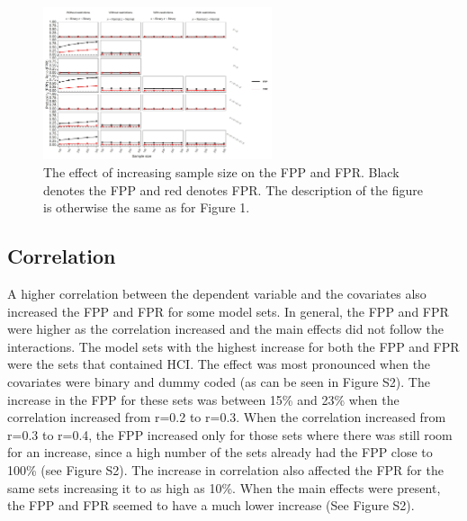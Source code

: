 \begin{figure}[t]
\includegraphics[width=0.6\textwidth]{R/Analysis/Result/Figures/Figure1D.jpeg}
\centering
\caption{The effect of increasing sample size on the FPP and FPR. Black denotes the FPP and red denotes FPR. The description of the figure is otherwise the same as for Figure 1.}
\label{fig:mainfigure}
\end{figure}

\subsection{Correlation}
A higher correlation between the dependent variable and the covariates also increased the FPP and FPR for some model sets. In general, the FPP and FPR were higher as the correlation increased and the main effects did not follow the interactions. The model sets with the highest increase for both the FPP and FPR were the sets that contained HCI. The effect was most pronounced when the covariates were binary and dummy coded (as can be seen in Figure S2). The increase in the FPP for these sets was between 15\% and 23\% when the correlation increased from r=0.2 to r=0.3. When the correlation increased from r=0.3 to r=0.4, the FPP increased only for those sets where there was still room for an increase, since a high number of the sets already had the FPP close to 100\% (see Figure S2). The increase in correlation also affected the FPR for the same sets increasing it to as high as 10\%. When the main effects were present, the FPP and FPR seemed to have a much lower increase (See Figure S2).